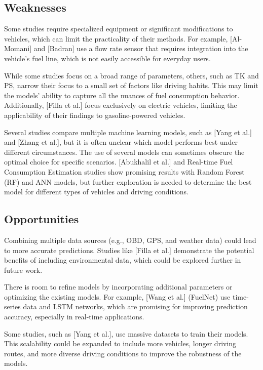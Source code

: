 \documentclass[letterpaper]{article}
\begin{document}
\subsection*{Weaknesses}

Some studies require specialized equipment or significant  modifications to vehicles, 
which can limit the practicality of their methods. For example, [Al-Momani] and [Badran] use a 
flow rate sensor that requires integration into the vehicle’s fuel line, which is not easily 
accessible for everyday users.

While some studies focus on a broad range of parameters, others, such as TK and PS, narrow 
their focus to a small set of factors like driving habits. This may limit the models' 
ability to capture all the nuances of fuel consumption behavior. Additionally, [Filla et al.] 
focus exclusively on electric vehicles, limiting the applicability of their findings to 
gasoline-powered vehicles.

Several studies compare multiple machine learning models, such as [Yang et al.] and 
[Zhang et al.], but it is often unclear which model performs best under different 
circumstances. The use of several models can sometimes obscure the optimal choice for 
specific scenarios. [Abukhalil et al.] and Real-time Fuel Consumption Estimation studies show 
promising results with Random Forest (RF) and ANN models, but further exploration is needed 
to determine the best model for different types of vehicles and driving conditions.


\subsection*{Opportunities}

Combining multiple data sources (e.g., OBD, GPS, and weather data) could lead to more accurate 
predictions. Studies like [Filla et al.] demonstrate the potential benefits of including 
environmental data, which could be explored further in future work.

There is room to refine models by incorporating additional parameters or optimizing the 
existing models. For example, [Wang et al.] (FuelNet) use time-series data and LSTM networks, 
which are promising for improving prediction accuracy, especially in real-time applications.

Some studies, such as [Yang et al.], use massive datasets to train their models. This 
scalability could be expanded to include more vehicles, longer driving routes, and more 
diverse driving conditions to improve the robustness of the models.
\end{document}

